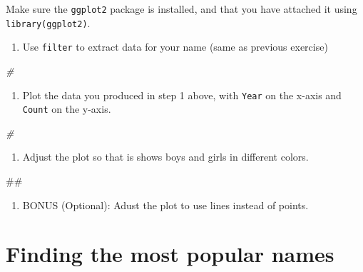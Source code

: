 \documentclass[]{book}
\newenvironment{Shaded}{\begin{snugshade}}{\end{snugshade}}
\newcommand{\CommentTok}[1]{\textcolor[rgb]{0.56,0.35,0.01}{\textit{#1}}}
\newcommand{\NormalTok}[1]{#1}
\providecommand{\tightlist}{%
  \setlength{\itemsep}{0pt}\setlength{\parskip}{0pt}}
\begin{document}
Make sure the \texttt{ggplot2} package is installed, and that you have
attached it using \texttt{library(ggplot2)}.

\begin{enumerate}
\def\labelenumi{\arabic{enumi}.}
\tightlist
\item
  Use \texttt{filter} to extract data for your name (same as previous
  exercise)
\end{enumerate}

\begin{Shaded}
\begin{Highlighting}[]
\CommentTok{#}
\end{Highlighting}
\end{Shaded}

\begin{enumerate}
\def\labelenumi{\arabic{enumi}.}
\setcounter{enumi}{1}
\tightlist
\item
  Plot the data you produced in step 1 above, with \texttt{Year} on the
  x-axis and \texttt{Count} on the y-axis.
\end{enumerate}

\begin{Shaded}
\begin{Highlighting}[]
\CommentTok{#}
\end{Highlighting}
\end{Shaded}

\begin{enumerate}
\def\labelenumi{\arabic{enumi}.}
\setcounter{enumi}{2}
\tightlist
\item
  Adjust the plot so that is shows boys and girls in different colors.
\end{enumerate}

\begin{Shaded}
\begin{Highlighting}[]
\NormalTok{##}
\end{Highlighting}
\end{Shaded}

\begin{enumerate}
\def\labelenumi{\arabic{enumi}.}
\setcounter{enumi}{3}
\tightlist
\item
  BONUS (Optional): Adust the plot to use lines instead of points.
\end{enumerate}

\section{Finding the most popular
names}\label{finding-the-most-popular-names}
\end{document}
